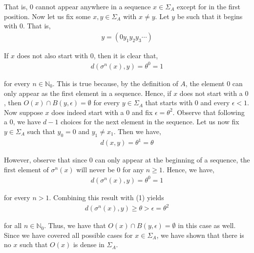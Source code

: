 \documentclass[12pt]{article}
\newenvironment{problem}[2][Problem]{\begin{trivlist}
\item[\hskip \labelsep {\bfseries #1}\hskip \labelsep {\bfseries #2.}]}{\end{trivlist}}
\begin{document}
That is, $0$ cannot appear anywhere in a sequence $x \in \Sigma_A$ except for in the first position. Now let us fix some $x, y \in \Sigma_A$ with $x \neq y$. Let $y$ be such that it begins with $0$. That is,
\begin{align*}
y = (0y_1y_2y_3\cdots)
\end{align*}

If $x$ does not also start with $0$, then it is clear that,
\begin{align*}
d(\sigma^n(x), y) = \theta^0 = 1
\end{align*}

for every $n \in \mathbb{N}_0$. This is true because, by the definition of $A$, the element $0$ can only appear as the first element in a sequence. Hence, if $x$ does not start with a $0$, then $O(x) \cap B(y, \epsilon) = \emptyset$ for every $y \in \Sigma_A$ that starts with $0$ and every $\epsilon < 1$.\\

Now suppose $x$ does indeed start with a $0$ and fix $\epsilon = \theta^2$. Observe that following a $0$, we have $d-1$ choices for the next element in the sequence. Let us now fix $y \in \Sigma_A$ such that $y_0 = 0$ and $y_1 \neq x_1$. Then we have,
\begin{align}
d(x, y) = \theta^1 = \theta
\end{align}

However, observe that since $0$ can only appear at the beginning of a sequence, the first element of $\sigma^n(x)$ will never be $0$ for any $n \geq 1$. Hence, we have,
\begin{align*}
d(\sigma^n(x), y) = \theta^0 = 1
\end{align*}

for every $n > 1$. Combining this result with (1) yields
\begin{align*}
d(\sigma^n(x), y) \geq \theta > \epsilon = \theta^2
\end{align*}

for all $n \in \mathbb{N}_0$. Thus, we have that $O(x) \cap B(y, \epsilon) = \emptyset$ in this case as well. Since we have covered all possible cases for $x \in \Sigma_A$, we have shown that there is no $x$ such that $O(x)$ is dense in $\Sigma_A$.


\begin{problem}{2}
\end{problem}
\end{document}
